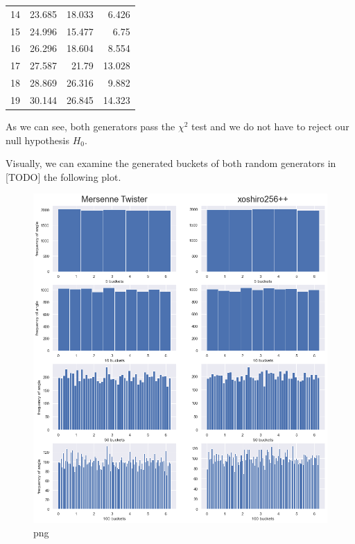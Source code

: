 \documentclass[
]{article}
\begin{document}
\begin{table}[]
\begin{tabular}{|l|c|r|r|}
14                             & 23.685                          & 18.033                                   & 6.426                                         \\ 
15                             & 24.996              & 15.477                                   & 6.75                                          \\
16                             & 26.296                          & 18.604                                   & 8.554                                         \\
17                             & 27.587                           & 21.79                                    & 13.028                            \\
18                             & 28.869                         & 26.316                                   & 9.882                                         \\ 
19                             & 30.144             & 26.845                                   & 14.323                                       
\end{tabular}
\end{table}

As we can see, both generators pass the \(\chi^2\) test and we do not
have to reject our null hypothesis \(H_0\).

Visually, we can examine the generated buckets of both random generators
in {[}TODO{]} the following plot.

\begin{figure}
\centering
\includegraphics{thesis_files/thesis_24_0.png}
\caption{png}
\end{figure}
\end{document}
